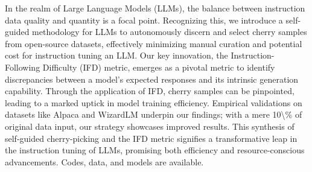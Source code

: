 In the realm of Large Language Models (LLMs), the balance between instruction data quality and quantity is a focal point. Recognizing this, we introduce a self-guided methodology for LLMs to autonomously discern and select cherry samples from open-source datasets, effectively minimizing manual curation and potential cost for instruction tuning an LLM. Our key innovation, the Instruction-Following Difficulty (IFD) metric, emerges as a pivotal metric to identify discrepancies between a model's expected responses and its intrinsic generation capability. Through the application of IFD, cherry samples can be pinpointed, leading to a marked uptick in model training efficiency. Empirical validations on datasets like Alpaca and WizardLM underpin our findings; with a mere 10\textbackslash{}\% of original data input, our strategy showcases improved results. This synthesis of self-guided cherry-picking and the IFD metric signifies a transformative leap in the instruction tuning of LLMs, promising both efficiency and resource-conscious advancements. Codes, data, and models are available.